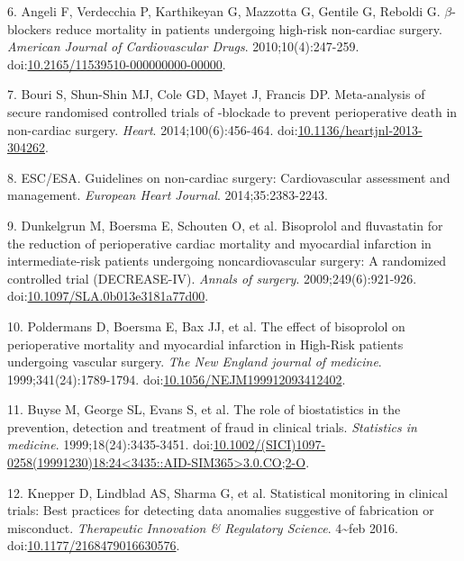 \documentclass[]{article}
\begin{document}
\hypertarget{ref-Angeli2010}{}
6. Angeli F, Verdecchia P, Karthikeyan G, Mazzotta G, Gentile G, Reboldi
G. \(\beta\)-blockers reduce mortality in patients undergoing high-risk
non-cardiac surgery. \emph{American Journal of Cardiovascular Drugs}.
2010;10(4):247-259.
doi:\href{https://doi.org/10.2165/11539510-000000000-00000}{10.2165/11539510-000000000-00000}.

\hypertarget{ref-bouri2014}{}
7. Bouri S, Shun-Shin MJ, Cole GD, Mayet J, Francis DP. Meta-analysis of
secure randomised controlled trials of -blockade to prevent
perioperative death in non-cardiac surgery. \emph{Heart}.
2014;100(6):456-464.
doi:\href{https://doi.org/10.1136/heartjnl-2013-304262}{10.1136/heartjnl-2013-304262}.

\hypertarget{ref-esc2014}{}
8. ESC/ESA. Guidelines on non-cardiac surgery: Cardiovascular assessment
and management. \emph{European Heart Journal}. 2014;35:2383-2243.

\hypertarget{ref-dunkelgrun2009}{}
9. Dunkelgrun M, Boersma E, Schouten O, et al. Bisoprolol and
fluvastatin for the reduction of perioperative cardiac mortality and
myocardial infarction in intermediate-risk patients undergoing
noncardiovascular surgery: A randomized controlled trial (DECREASE-IV).
\emph{Annals of surgery}. 2009;249(6):921-926.
doi:\href{https://doi.org/10.1097/SLA.0b013e3181a77d00}{10.1097/SLA.0b013e3181a77d00}.

\hypertarget{ref-poldermans1999}{}
10. Poldermans D, Boersma E, Bax JJ, et al. The effect of bisoprolol on
perioperative mortality and myocardial infarction in High-Risk patients
undergoing vascular surgery. \emph{The New England journal of medicine}.
1999;341(24):1789-1794.
doi:\href{https://doi.org/10.1056/NEJM199912093412402}{10.1056/NEJM199912093412402}.

\hypertarget{ref-Buyse1999-jq}{}
11. Buyse M, George SL, Evans S, et al. The role of biostatistics in the
prevention, detection and treatment of fraud in clinical trials.
\emph{Statistics in medicine}. 1999;18(24):3435-3451.
doi:\href{https://doi.org/10.1002/(SICI)1097-0258(19991230)18:24\%3C3435::AID-SIM365\%3E3.0.CO;2-O}{10.1002/(SICI)1097-0258(19991230)18:24\textless{}3435::AID-SIM365\textgreater{}3.0.CO;2-O}.

\hypertarget{ref-Knepper2016-la}{}
12. Knepper D, Lindblad AS, Sharma G, et al. Statistical monitoring in
clinical trials: Best practices for detecting data anomalies suggestive
of fabrication or misconduct. \emph{Therapeutic Innovation \& Regulatory
Science}. 4\textasciitilde{}feb 2016.
doi:\href{https://doi.org/10.1177/2168479016630576}{10.1177/2168479016630576}.
\end{document}
